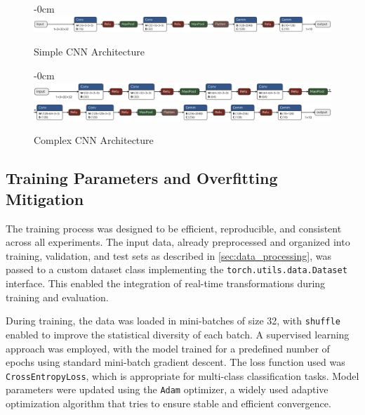 \documentclass[journal,article,submit,pdftex,moreauthors]{Definitions/mdpi}
\begin{document}
\begin{figure}[H]
\begin{adjustwidth}{-\extralength}{0cm}
\centering
\includegraphics[width=\linewidth]{Definitions/simple_cnn.png}
\end{adjustwidth}
\caption{Simple CNN Architecture \label{fig:arq_simples}}
\end{figure}

\begin{figure}[H]
\begin{adjustwidth}{-\extralength}{0cm}
\centering
\includegraphics[width=\linewidth]{Definitions/complex_cnn (Copy).png}\\[0.5em]
\includegraphics[width=\linewidth]{Definitions/complex_cnn (Copy 2).png}
\end{adjustwidth}
\caption{Complex CNN Architecture \label{fig:arq_complexa}}

\vspace{0.5em}
\end{figure}

\clearpage
\subsection{Training Parameters and Overfitting Mitigation}

The training process was designed to be efficient, reproducible, and consistent across all experiments. The input data, already preprocessed and organized into training, validation, and test sets as described in \autoref{sec:data_processing}, was passed to a custom dataset class implementing the \texttt{torch.utils.data.Dataset} interface. This enabled the integration of real-time transformations during training and evaluation.

During training, the data was loaded in mini-batches of size 32, with \texttt{shuffle} enabled to improve the statistical diversity of each batch. A supervised learning approach was employed, with the model trained for a predefined number of epochs using standard mini-batch gradient descent. The loss function used was \texttt{CrossEntropyLoss}, which is appropriate for multi-class classification tasks. Model parameters were updated using the \texttt{Adam} optimizer, a widely used adaptive optimization algorithm that tries to ensure stable and efficient convergence.
\end{document}
